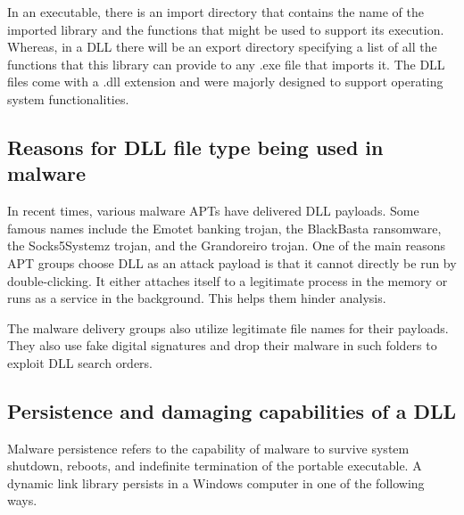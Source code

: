 \documentclass{article}
\begin{document}
In an executable, there is an import directory that contains the name of the imported library and the functions that might be used to support its execution. Whereas, in a DLL there will be an export directory specifying a list of all the functions that this library can provide to any .exe file that imports it. The DLL files come with a .dll extension and were majorly designed to support operating system functionalities.

\subsection{Reasons for DLL file type being used in malware}
In recent times, various malware APTs have delivered DLL payloads. Some famous names include the Emotet banking trojan, the BlackBasta ransomware, the Socks5Systemz\cite{socks5systemz} trojan, and the Grandoreiro\cite{grandoreiro} trojan. One of the main reasons APT groups choose DLL as an attack payload is that it cannot directly be run by double-clicking. It either attaches itself to a legitimate process in the memory or runs as a service in the background. This helps them hinder analysis.

The malware delivery groups also utilize legitimate file names for their payloads. They also use fake digital signatures and drop their malware in such folders to exploit DLL search orders.

\subsection{Persistence and damaging capabilities of a DLL}
Malware persistence\cite{malware_persistence} refers to the capability of malware to survive system shutdown, reboots, and indefinite termination of the portable executable. A dynamic link library persists in a Windows computer in one of the following ways.
\end{document}
